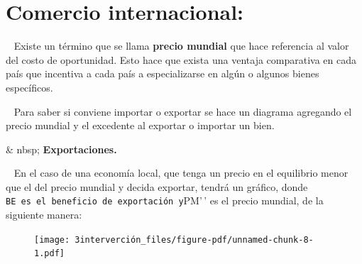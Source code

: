 \documentclass[
  letterpaper,
  DIV=11,
  numbers=noendperiod]{scrreport}
\begin{document}
\begin{multicols}{2}

\end{multicols}

\hypertarget{comercio-internacional}{%
\section{Comercio internacional:}\label{comercio-internacional}}

~ Existe un término que se llama \textbf{precio mundial} que hace
referencia al valor del costo de oportunidad. Esto hace que exista una
ventaja comparativa en cada país que incentiva a cada país a
especializarse en algún o algunos bienes específicos.

~ Para saber si conviene importar o exportar se hace un diagrama
agregando el precio mundial y el excedente al exportar o importar un
bien.

\& nbsp; \textbf{Exportaciones.}

~ En el caso de una economía local, que tenga un precio en el equilibrio
menor que el del precio mundial y decida exportar, tendrá un gráfico,
donde
\texttt{BE\textquotesingle{}\textquotesingle{}\ es\ el\ beneficio\ de\ exportación\ y}PM'\,'
es el precio mundial, de la siguiente manera:

\newpage

\begin{figure}

{\centering \texttt{[image: 3interverción\_files/figure-pdf/unnamed-chunk-8-1.pdf]}

}

\end{figure}
\end{document}
